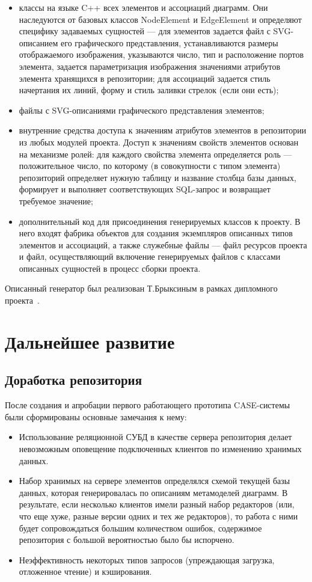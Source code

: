 \documentclass[a5paper]{article}
\begin{document}
\begin{itemize}
  \item классы на языке C++ всех элементов и
	ассоциаций диаграмм. Они наследуются от базовых классов
	NodeElement и EdgeElement и определяют специфику
	задаваемых сущностей --– для элементов задается файл с
	SVG-описанием его графического
	представления, устанавливаются размеры отображаемого изображения,
	указываются число, тип и расположение портов элемента, задается
	параметризация изображения значениями атрибутов элемента хранящихся в
	репозитории; для ассоциаций задается стиль начертания их линий, форму и
	стиль заливки стрелок (если они есть);
  \item файлы с SVG-описаниями графического представления элементов;
  \item внутренние средства доступа к значениям атрибутов элементов в
	репозитории из любых модулей проекта. Доступ к значениям свойств
	элементов основан на механизме ролей: для каждого свойства элемента
	определяется роль --– положительное число, по которому (в совокупности
	с типом элемента) репозиторий определяет нужную таблицу и название
	столбца базы данных, формирует и выполняет соответствующих
	SQL-запрос и возвращает требуемое значение;
  \item дополнительный код для присоединения генерируемых классов к проекту. В
	него входят фабрика объектов для создания экземпляров описанных типов
	элементов и ассоциаций, а также служебные файлы --– файл ресурсов проекта
	и файл, осуществляющий включение генерируемых файлов с классами
	описанных сущностей в процесс сборки проекта.
\end{itemize}

Описанный генератор был реализован Т.Брыксиным в рамках дипломного
проекта~\cite{bryksin}.

\section{Дальнейшее развитие}
\subsection{Доработка репозитория}

После создания и апробации первого работающего прототипа
CASE-системы были сформированы основные замечания к нему:

\begin{itemize}
  \item Использование реляционной СУБД в качестве сервера репозитория делает
	невозможным оповещение подключенных клиентов по изменению хранимых
	данных.
  \item Набор хранимых на сервере элементов определялся схемой текущей базы
	данных, которая генерировалась по описаниям метамоделей диаграмм. В
	результате, если несколько клиентов имели разный набор редакторов (или,
	что еще хуже, разные версии одних и тех же редакторов), то работа с
	ними будет сопровождаться большим количеством ошибок, содержимое
	репозитория с большой вероятностью было бы испорчено.
  \item Неэффективность некоторых типов запросов (упреждающая загрузка,
	отложенное чтение) и кэширования.
\end{itemize}
\end{document}
